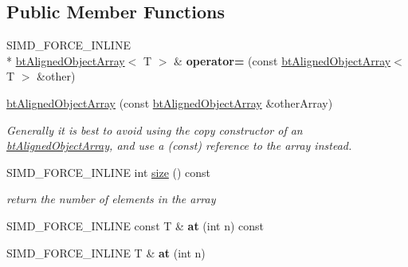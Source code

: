 \subsection*{Public Member Functions}
\begin{DoxyCompactItemize}
\item 
\hypertarget{classbt_aligned_object_array_ab6ea335622f18386671194eb6bd6a41b}{S\+I\+M\+D\+\_\+\+F\+O\+R\+C\+E\+\_\+\+I\+N\+L\+I\+N\+E \\*
\hyperlink{classbt_aligned_object_array}{bt\+Aligned\+Object\+Array}$<$ T $>$ \& {\bfseries operator=} (const \hyperlink{classbt_aligned_object_array}{bt\+Aligned\+Object\+Array}$<$ T $>$ \&other)}\label{classbt_aligned_object_array_ab6ea335622f18386671194eb6bd6a41b}

\item 
\hypertarget{classbt_aligned_object_array_ae91d1383db8069a02d23caf915bc2ce3}{\hyperlink{classbt_aligned_object_array_ae91d1383db8069a02d23caf915bc2ce3}{bt\+Aligned\+Object\+Array} (const \hyperlink{classbt_aligned_object_array}{bt\+Aligned\+Object\+Array} \&other\+Array)}\label{classbt_aligned_object_array_ae91d1383db8069a02d23caf915bc2ce3}

\begin{DoxyCompactList}\small\item\em Generally it is best to avoid using the copy constructor of an \hyperlink{classbt_aligned_object_array}{bt\+Aligned\+Object\+Array}, and use a (const) reference to the array instead. \end{DoxyCompactList}\item 
\hypertarget{classbt_aligned_object_array_a6bdd14c7599ecb95e8d83dd5a715f9b7}{S\+I\+M\+D\+\_\+\+F\+O\+R\+C\+E\+\_\+\+I\+N\+L\+I\+N\+E int \hyperlink{classbt_aligned_object_array_a6bdd14c7599ecb95e8d83dd5a715f9b7}{size} () const }\label{classbt_aligned_object_array_a6bdd14c7599ecb95e8d83dd5a715f9b7}

\begin{DoxyCompactList}\small\item\em return the number of elements in the array \end{DoxyCompactList}\item 
\hypertarget{classbt_aligned_object_array_a0a7cbc2d7afb6e816fed998a5d9f7e3f}{S\+I\+M\+D\+\_\+\+F\+O\+R\+C\+E\+\_\+\+I\+N\+L\+I\+N\+E const T \& {\bfseries at} (int n) const }\label{classbt_aligned_object_array_a0a7cbc2d7afb6e816fed998a5d9f7e3f}

\item 
\hypertarget{classbt_aligned_object_array_a3792644f8e758fae5b4613fbcd1fd30f}{S\+I\+M\+D\+\_\+\+F\+O\+R\+C\+E\+\_\+\+I\+N\+L\+I\+N\+E T \& {\bfseries at} (int n)}\label{classbt_aligned_object_array_a3792644f8e758fae5b4613fbcd1fd30f}


\end{DoxyCompactItemize}
